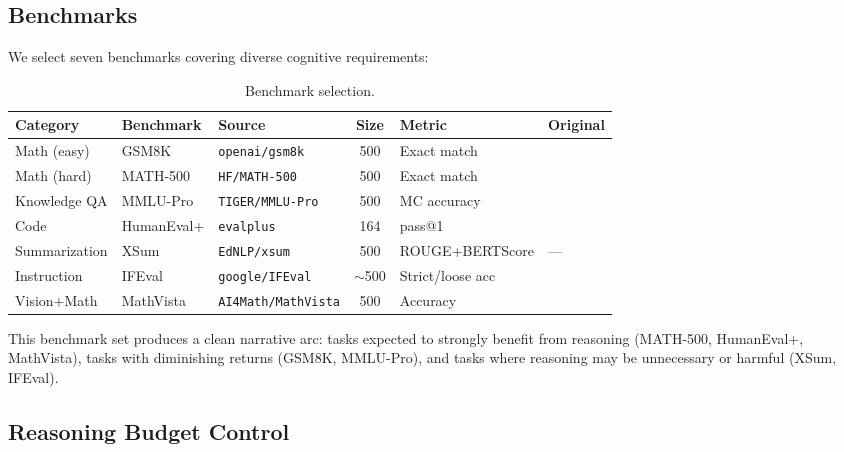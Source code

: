 \documentclass[11pt]{article}
\begin{document}
\subsection{Benchmarks}

We select seven benchmarks covering diverse cognitive requirements:

\begin{table}[h]
\centering
\caption{Benchmark selection.}
\label{tab:benchmarks}
\small
\begin{tabular}{@{}p{2.0cm}p{1.6cm}p{2.8cm}cp{2.2cm}p{2.5cm}@{}}
\toprule
\textbf{Category} & \textbf{Benchmark} & \textbf{Source} & \textbf{Size} & \textbf{Metric} & \textbf{Original} \\
\midrule
Math (easy) & GSM8K & \texttt{openai/gsm8k} & 500 & Exact match & \citet{cobbe2021gsm8k} \\
Math (hard) & MATH-500 & \texttt{HF/MATH-500} & 500 & Exact match & \citet{hendrycks2021math} \\
Knowledge QA & MMLU-Pro & \texttt{TIGER/MMLU-Pro} & 500 & MC accuracy & \citet{wang2024mmlupro} \\
Code & HumanEval+ & \texttt{evalplus} & 164 & pass@1 & \citet{chen2021humaneval} \\
Summarization & XSum & \texttt{EdNLP/xsum} & 500 & ROUGE+BERTScore & --- \\
Instruction & IFEval & \texttt{google/IFEval} & $\sim$500 & Strict/loose acc & \citet{zhou2023ifeval} \\
Vision+Math & MathVista & \texttt{AI4Math/MathVista} & 500 & Accuracy & \citet{lu2024mathvista} \\
\bottomrule
\end{tabular}
\end{table}

This benchmark set produces a clean narrative arc: tasks expected to strongly benefit from reasoning (MATH-500, HumanEval+, MathVista), tasks with diminishing returns (GSM8K, MMLU-Pro), and tasks where reasoning may be unnecessary or harmful (XSum, IFEval).

\subsection{Reasoning Budget Control}
\end{document}
